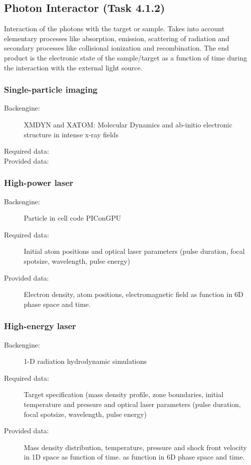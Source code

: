 \documentclass[12pt]{scrartcl}
\begin{document}
\subsection{Photon Interactor (Task 4.1.2)}
Interaction of the photons with the target or sample. Takes into account
elementary processes like absorption, emission, scattering of radiation and
secondary processes like collisional ionization and recombination. The end
product is the electronic state of the sample/target as a function of time
during the interaction with the external light source.
\subsubsection{Single-particle imaging}
\begin{description}
  \item[Backengine:] XMDYN and XATOM: Molecular Dynamics and ab-initio
    electronic structure in intense x-ray fields \cite{Jurek2016, Son2013,
    Ziaja2015}
  \item[Required data:]
  \item[Provided data:]
\end{description}

\subsubsection{High-power laser}
\begin{description}
  \item[Backengine:] Particle in cell code PIConGPU \cite{Bussmann2013}
  \item[Required data:] Initial atom positions and optical laser parameters
    (pulse duration, focal spotsize, wavelength, pulse energy)
  \item[Provided data:] Electron density, atom positions, electromagnetic field
    as function in 6D phase space and time.
\end{description}
%
\subsubsection{High-energy laser}
\begin{description}
  \item[Backengine:] 1-D radiation hydrodynamic simulations
  \item[Required data:] Target specification (mass density profile, zone
    boundaries, initial temperature and pressure and optical laser parameters
    (pulse duration, focal spotsize, wavelength, pulse energy)
  \item[Provided data:] Mass density distribution, temperature, pressure and
    shock front velocity in 1D space as function of time.
    as function in 6D phase space and time.
\end{description}
\end{document}

